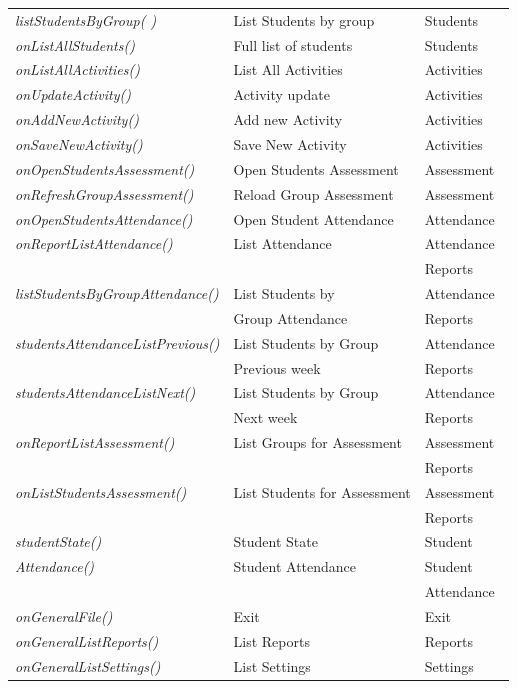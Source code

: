 \begin{bclogo}[couleur=orange!30,logo=\bcbook, arrondi=0.1,ombre=true ]
\begin{tabular}{lll}
\emph{ listStudentsByGroup( )}   & List Students by group          &  Students \\
\emph{ onListAllStudents()  }    & Full list of students           &  Students \\
\emph{ onListAllActivities()}   & List All Activities             &    Activities \\
\emph{ onUpdateActivity()  }   & Activity update                 &   Activities \\
\emph{ onAddNewActivity()  }   & Add new Activity                &   Activities \\
\emph{ onSaveNewActivity() }    & Save New Activity               &   Activities \\
\emph{ onOpenStudentsAssessment()} & Open Students Assessment        &   Assessment \\
\emph{ onRefreshGroupAssessment()} & Reload Group Assessment         &  Assessment \\
\emph{ onOpenStudentsAttendance() }& Open Student Attendance         & Attendance \\
\emph{ onReportListAttendance() }  & List Attendance                 &  Attendance\ \\
                         &                                   & Reports \\
\emph{ listStudentsByGroupAttendance() } & List Students by             & Attendance \\
    & Group Attendance           &    Reports \\
\emph{ studentsAttendanceListPrevious()} &List Students by Group     &  Attendance\\
    &Previous week                                              & Reports \\

\emph{ studentsAttendanceListNext()} & List Students by Group    & Attendance  \\
    &Next week   &   Reports\\

\emph{ onReportListAssessment() } & List Groups for Assessment      &   Assessment  \\
                         &                                   & Reports \\
  \emph{ onListStudentsAssessment()} & List Students for Assessment    &Assessment  \\
                         &                                   & Reports \\
 \emph{ studentState() }    & Student State       &   Student \\
\emph{ Attendance()}    & Student Attendance &   Student  \\
                 &                  &  Attendance \\
\emph{ onGeneralFile()} &Exit            &  Exit  \\
\emph{ onGeneralListReports()}    & List Reports    &  Reports \\
\emph{ onGeneralListSettings()}  & List Settings   &   Settings \\


\end{tabular}
\end{bclogo}
